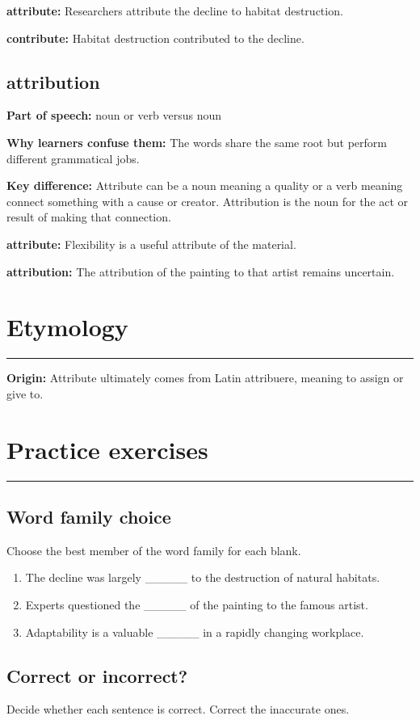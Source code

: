 \documentclass[11pt]{article}
\newcommand{\sectionrule}{\par\vspace{-0.5em}\noindent\textcolor{Accent}{\rule{\linewidth}{0.6pt}}\par}
\begin{document}
\textbf{attribute:} Researchers attribute the decline to habitat destruction.

\textbf{contribute:} Habitat destruction contributed to the decline.

\subsection{attribution}
\textbf{Part of speech:} noun or verb versus noun

\textbf{Why learners confuse them:} The words share the same root but perform different grammatical jobs.

\textbf{Key difference:} Attribute can be a noun meaning a quality or a verb meaning connect something with a cause or creator. Attribution is the noun for the act or result of making that connection.

\textbf{attribute:} Flexibility is a useful attribute of the material.

\textbf{attribution:} The attribution of the painting to that artist remains uncertain.

\section{Etymology}
\sectionrule
\textbf{Origin:} Attribute ultimately comes from Latin attribuere, meaning to assign or give to.

\section{Practice exercises}
\sectionrule
\subsection{Word family choice}
Choose the best member of the word family for each blank.

\begin{enumerate}
  \item The decline was largely \_\_\_\_\_ to the destruction of natural habitats.
  \item Experts questioned the \_\_\_\_\_ of the painting to the famous artist.
  \item Adaptability is a valuable \_\_\_\_\_ in a rapidly changing workplace.
\end{enumerate}

\subsection{Correct or incorrect?}
Decide whether each sentence is correct. Correct the inaccurate ones.
\end{document}
